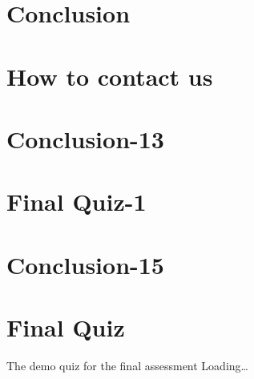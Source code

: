 \documentclass[
]{book}
\begin{document}
\hypertarget{conclusion}{%
\chapter{Conclusion}\label{conclusion}}

\hypertarget{how-to-contact-us}{%
\chapter{How to contact us}\label{how-to-contact-us}}

\hypertarget{conclusion-13}{%
\chapter{Conclusion-13}\label{conclusion-13}}

\hypertarget{final-quiz-1}{%
\chapter{Final Quiz-1}\label{final-quiz-1}}

\hypertarget{conclusion-15}{%
\chapter{Conclusion-15}\label{conclusion-15}}

\hypertarget{final-quiz}{%
\chapter{Final Quiz}\label{final-quiz}}

The demo quiz for the final assessment
Loading\ldots{}

  
\end{document}
